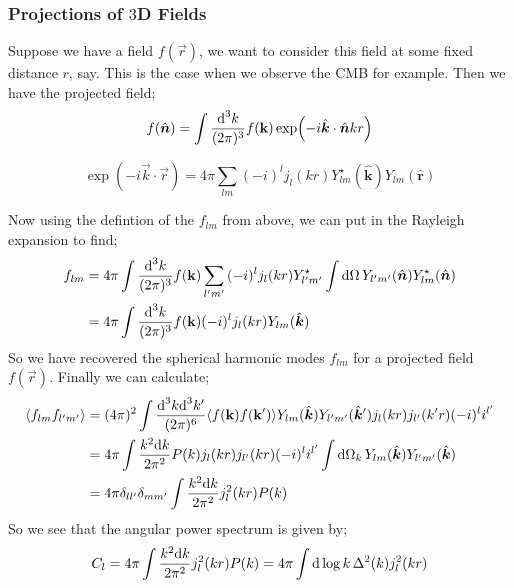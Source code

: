 \subsubsection{Projections of $3$D Fields}
Suppose we have a field $f(\vec r)$, we want to consider this field at some fixed distance $r$, say. This is the case when we observe the CMB for example. Then we have the projected field;
\begin{equation}
f(\hat{\bm{n}}) = \int{\frac{\text{d}^3 k}{(2\pi)^3}f(\mathbf k)\exp(-i\hat{\bm{k}}\cdot \hat{\bm{n}}kr)}
\end{equation}
\begin{definitionbox}
\begin{equation}
\exp(- i \vec k \cdot \vec r) = 4\pi \sum_{lm}{(-i)^l j_{l}(kr)Y_{lm}^{\star}(\hat{\bm{k}})Y_{lm}(\hat{\bm{r}})}
\end{equation}
\end{definitionbox}
Now using the defintion of the $f_{lm}$ from above, we can put in the Rayleigh expansion to find;
\begin{align*}
f_{lm} &= 4\pi\int{\frac{\text{d}^3 k}{(2\pi)^3}f(\mathbf k)\sum_{l^{\prime}m^{\prime}}{(-i)^l j_{l}(kr)Y^{\star}_{l^{\prime}m^{\prime}}\int{\text{d}\Omega \, Y_{l^{\prime}m^{\prime}}(\hat{\bm{n}})Y^{\star}_{lm}(\hat{\bm{n}})}}} \\
&= 4\pi \int{\frac{\text{d}^3 k}{(2\pi)^3}f(\mathbf k)(-i)^{l}j_{l}(kr)Y_{lm}(\hat{\bm{k}})}
\end{align*}
So we have recovered the spherical harmonic modes $f_{lm}$ for a projected field $f(\vec r)$. Finally we can calculate;
\begin{align*}
\left< f_{lm}f_{l\pr m\pr} \right> &= (4\pi)^2 \int{\frac{\ud^3 k \ud^3 k\pr}{(2\pi)^6}\left< f(\vec k) f(\vec k\pr) \right> Y_{lm}(\hat{\bm{k}})Y_{l\pr m\pr}(\hat{\bm{k}}\pr) j_l (kr) j_{l\pr}(k\pr r)}(-i)^l i^{l\pr} \\
&= 4\pi \int{\frac{k^2 \ud k}{2\pi^2}P(k)j_l(kr)j_{l\pr}(kr)(-i)^l i^{l\pr}\int{\upd{\Omega_k}Y_{lm}(\hat{\bm{k}})Y_{l\pr m\pr}(\hat{\bm{k}})}} \\
&= 4\pi\delta_{l l\pr}\delta_{m m\pr}\int{\frac{k^2 \ud k}{2\pi^2}j_l^2(kr)P(k)}
\end{align*}
So we see that the angular power spectrum is given by;
\begin{equation}
C_l = 4\pi \int{\frac{k^2 \text{d}k}{2\pi^2}j_l^2(kr)P(k)} = 4\pi \int{\text{d}\log k \,\Delta^2(k)j_l^2(kr)}
\end{equation}
\newpage
